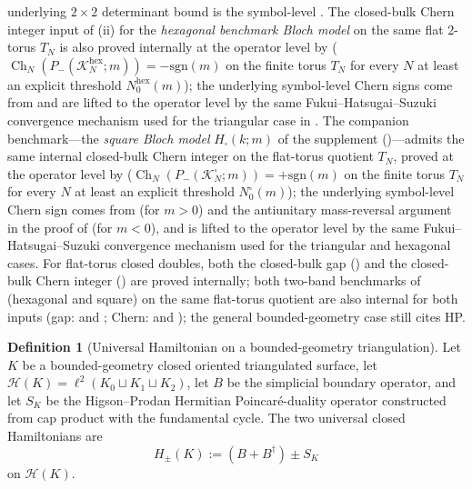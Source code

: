 \documentclass[11pt]{article}
\numberwithin{equation}{section}
\theoremstyle{definition}
\newtheorem{definition}[theorem]{Definition}
\theoremstyle{remark}
\newcommand{\K}{\mathcal{K}}
\newcommand{\Hil}{\mathcal{H}}
\newcommand{\sgn}{\mathrm{sgn}}
\newcommand{\Ch}{\operatorname{Ch}}
\newcommand{\hexagon}{\mathrm{hex}}
\begin{document}
underlying \(2\times 2\) determinant bound is the symbol-level
. The closed-bulk Chern integer input of
(ii) for the \emph{hexagonal benchmark Bloch model} on the same flat
2-torus \(T_N\) is also proved internally at the operator level by
 (\(\Ch_N(P_-(\K_N^{\hexagon};m))=-\sgn(m)\) on the finite torus
\(T_N\) for every \(N\) at least an explicit threshold \(N_0^{\hexagon}(m)\)); the underlying
symbol-level Chern signs come from  and
are lifted to the operator level by the same Fukui--Hatsugai--Suzuki convergence mechanism used
for the triangular case in . The companion benchmark---the
\emph{square Bloch model} \(H_{\square}(k;m)\) of the supplement
()---admits the same internal closed-bulk Chern integer on the
flat-torus quotient \(T_N\), proved at the operator level by 
(\(\Ch_N(P_-(\K_N^{\square};m))=+\sgn(m)\) on the finite torus \(T_N\) for every \(N\) at
least an explicit threshold \(N_0^{\square}(m)\)); the underlying symbol-level Chern sign comes
from  (for \(m>0\)) and the antiunitary mass-reversal
argument in the proof of  (for \(m<0\)), and is lifted to
the operator level by the same Fukui--Hatsugai--Suzuki convergence mechanism used for the
triangular and hexagonal cases. For flat-torus closed doubles, both the closed-bulk gap
() and the closed-bulk Chern integer
() are proved internally; both two-band benchmarks of
 (hexagonal and square) on the same flat-torus quotient are
also internal for both inputs (gap:  and
; Chern:  and
); the general bounded-geometry case still cites HP.

\begin{definition}[Universal Hamiltonian on a bounded-geometry triangulation]\label{def:pathb_universal_hamiltonian}
Let \(K\) be a bounded-geometry closed oriented triangulated surface, let
\(\Hil(K)=\ell^2(K_0\sqcup K_1\sqcup K_2)\), let \(B\) be the simplicial boundary operator, and let
\(S_K\) be the Higson--Prodan Hermitian Poincar\'e-duality operator constructed from cap product
with the fundamental cycle. The two universal closed Hamiltonians are
\[
H_\pm(K):=(B+B^\dagger)\pm S_K
\]
on \(\Hil(K)\).
\end{definition}
\end{document}
